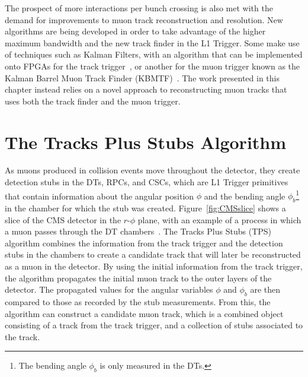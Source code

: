 The prospect of more interactions per bunch crossing is also met with the demand for improvements to muon track reconstruction and resolution.
New algorithms are being developed in order to take advantage of the higher maximum bandwidth and the new track finder in the L1 Trigger.
Some make use of techniques such as Kalman Filters, with an algorithm that can be implemented onto FPGAs for the track trigger~\cite{Amstutz:2194514}, or another for the muon trigger known as the Kalman Barrel Muon Track Finder (KBMTF)~\cite{Bachtis:2648953}.
The work presented in this chapter instead relies on a novel approach to reconstructing muon tracks that uses both the track finder and the muon trigger.

\section{The Tracks Plus Stubs Algorithm}
\label{sec:TPS}

As muons produced in collision events move throughout the detector, they create detection stubs in the DTs, RPCs, and CSCs, which are L1 Trigger primitives that contain information about the angular position $\phi$ and the bending angle $\phi_b$\footnote{The bending angle $\phi_b$ is only measured in the DTs.} in the chamber for which the stub was created.
Figure~\ref{fig:CMSslice} shows a slice of the CMS detector in the $r$-$\phi$ plane, with an example of a process in which a muon passes through the DT chambers~\cite{Barney:2120661}.
The Tracks Plus Stubs (TPS) algorithm combines the information from the track trigger and the detection stubs in the chambers to create a candidate track that will later be reconstructed as a muon in the detector.
By using the initial information from the track trigger, the algorithm propagates the initial muon track to the outer layers of the detector.
The propagated values for the angular variables $\phi$ and $\phi_b$ are then compared to those as recorded by the stub measurements.
From this, the algorithm can construct a candidate muon track, which is a combined object consisting of a track from the track trigger, and a collection of stubs associated to the track.

